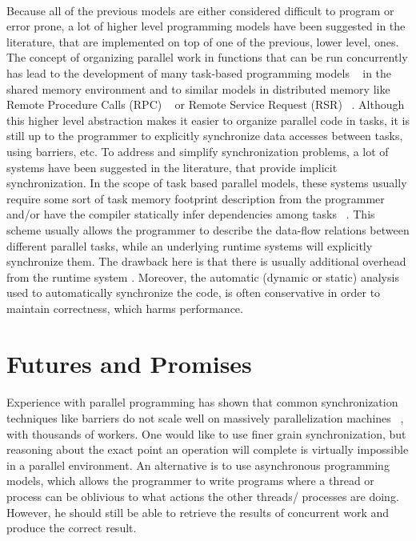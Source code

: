 \paragraph{}
Because all of the previous models are either considered difficult to program or error prone, a lot of higher 
level programming models have been suggested in the literature, that are implemented on top of one of the 
previous, lower level, ones.  The concept of organizing parallel work in functions that can be run
concurrently has lead to the development of many task-based programming models
~\cite{Ayguade:2009:DOT:1512157.1512430, Blumofe95cilk:an} in the shared memory
environment and to similar models in distributed memory like Remote Procedure Calls (RPC)
~\cite{Saunders:2003:AAP:966049.781534,Beckman96tulip:a,Vadhiyar03gradsolve-}
or Remote Service Request (RSR) ~\cite{Foster96thenexus}.  Although this higher level
abstraction makes it easier to organize parallel code in tasks, it is still up to the 
programmer to explicitly synchronize data accesses between tasks, using barriers, etc.
To address and simplify synchronization problems, a lot of systems have been suggested
in the literature, that provide implicit synchronization.  In the scope of task based parallel
models, these systems usually require some sort of task memory footprint description from the 
programmer~\cite{Tzenakis:2012:BBD:2370036.2145864, Perez:2010:HTD:1810085.1810122}
and/or have the compiler statically infer dependencies among tasks 
~\cite{Jenista:2011:OSO:1941553.1941563, Zakkak:2012:IDI:2370816.2370892}.
This scheme usually allows the programmer to describe the data-flow relations between different
parallel tasks, while an underlying runtime systems will explicitly synchronize them.  The drawback
here is that there is usually additional overhead from the runtime system .  Moreover, the automatic
(dynamic or static) analysis used to automatically synchronize the code, is often conservative
in order to maintain correctness, which harms performance.

\section{Futures and Promises}
\label{sect:futures-promises}

\paragraph{}
Experience with parallel programming has shown that common synchronization techniques like
barriers do not scale well on massively parallelization machines ~\cite{4100352}, with thousands of workers.
One would like to use finer grain synchronization, but reasoning about the exact point an operation will complete
is virtually impossible in a parallel environment.  An alternative is to use asynchronous programming models, which
allows the programmer to write programs where a thread or process can be oblivious to what actions the other threads/
processes are doing.  However, he should still be able to retrieve the results of concurrent work and produce the correct result.

